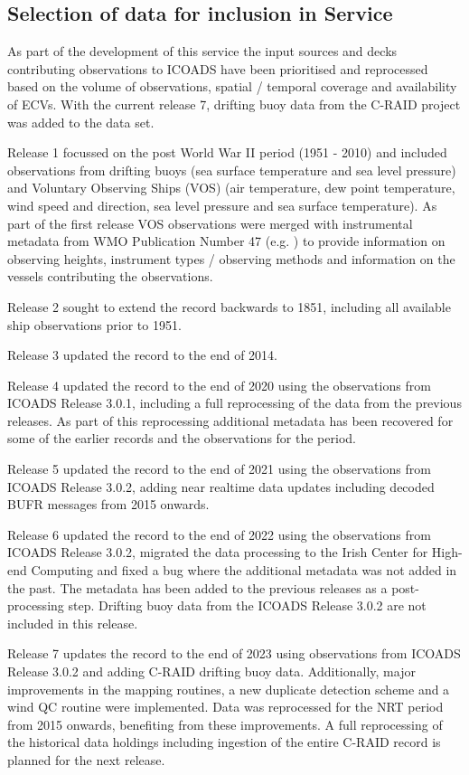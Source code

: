 \subsection{Selection of data for inclusion in Service}
As part of the development of this service the input sources and decks contributing observations to ICOADS have been prioritised and reprocessed based on the volume of observations, spatial / temporal coverage and availability of ECVs. With the current release 7, drifting buoy data from the C-RAID project was added to the data set.

Release 1 focussed on the post World War II period (1951 - 2010) and included observations from drifting buoys (sea surface temperature and sea level pressure) and Voluntary Observing Ships (VOS) (air temperature, dew point temperature, wind speed and direction, sea level pressure and sea surface temperature).
As part of the first release VOS observations were merged with instrumental metadata from WMO Publication Number 47 (e.g. \cite{Kent2007}) to provide information on observing heights, instrument types / observing methods and information on the vessels contributing the observations. 

Release 2 sought to extend the record backwards to 1851, including all available ship observations prior to 1951.

Release 3 updated the record to the end of 2014. 

Release 4 updated the record to the end of 2020 using the observations from ICOADS Release 3.0.1, including a full reprocessing of the data from the previous releases. As part of this reprocessing additional metadata has been recovered for some of the earlier records and the observations for the period.

Release 5 updated the record to the end of 2021 using the observations from ICOADS Release 3.0.2, adding near realtime data updates including decoded BUFR messages from 2015 onwards.

Release 6 updated the record to the end of 2022 using the observations from ICOADS Release 3.0.2, migrated the data processing to the Irish Center for High-end Computing and fixed a bug where the additional metadata was not added in the past. The metadata has been added to the previous releases as a post-processing step.
Drifting buoy data from the ICOADS Release 3.0.2 are not included in this release.

Release 7 updates the record to the end of 2023 using observations from ICOADS Release 3.0.2 and adding C-RAID drifting buoy data. Additionally, major improvements in the mapping routines, a new duplicate detection scheme and a wind QC routine were implemented.
Data was reprocessed for the NRT period from 2015 onwards, benefiting from these improvements. A full reprocessing of the historical data holdings including ingestion of the entire C-RAID record is planned for the next release.



